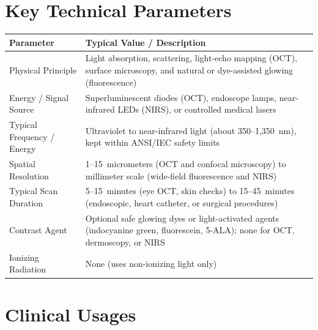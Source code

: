 \section{Key Technical Parameters}
\noindent
\begin{tabularx}{\textwidth}{@{}l X@{}}
\toprule
\textbf{Parameter} & \textbf{Typical Value / Description} \\
\midrule
Physical Principle & Light absorption, scattering, light-echo mapping (OCT), surface microscopy, and natural or dye-assisted glowing (fluorescence) \\
Energy / Signal Source & Superluminescent diodes (OCT), endoscope lamps, near-infrared LEDs (NIRS), or controlled medical lasers \\
Typical Frequency / Energy & Ultraviolet to near-infrared light (about 350--1,350~nm), kept within ANSI/IEC safety limits \\
Spatial Resolution & 1--15~micrometers (OCT and confocal microscopy) to millimeter scale (wide-field fluorescence and NIRS) \\
Typical Scan Duration & 5--15~minutes (eye OCT, skin checks) to 15--45~minutes (endoscopic, heart catheter, or surgical procedures) \\
Contrast Agent & Optional safe glowing dyes or light-activated agents (indocyanine green, fluorescein, 5-ALA); none for OCT, dermoscopy, or NIRS \\
Ionizing Radiation & None (uses non-ionizing light only) \\
\bottomrule
\end{tabularx}

\section{Clinical Usages}

